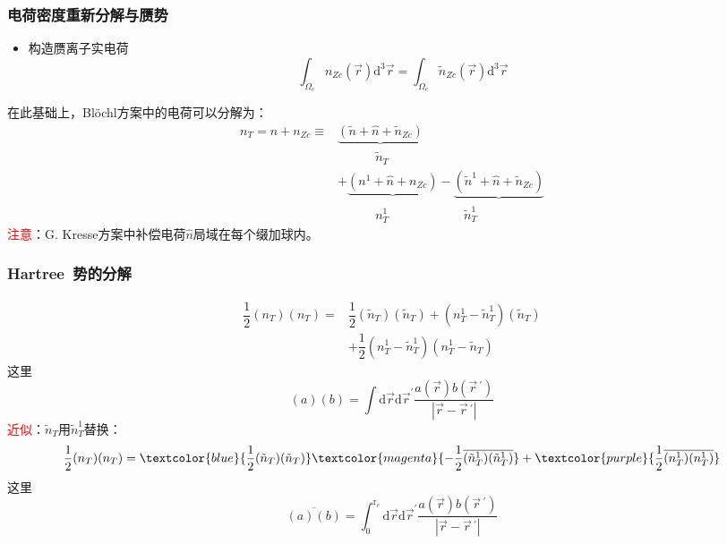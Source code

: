 \frame
{
	\frametitle{电荷密度重新分解与赝势}
\begin{itemize}
	\item 构造赝离子实电荷$$\int_{\Omega_c}n_{Zc}(\vec r)\mathrm{d}^3\vec r=\int_{\Omega_c}\tilde n_{Zc}(\vec r)\mathrm{d}^3\vec r$$
\end{itemize}
在此基础上，\textrm{Bl\"ochl}方案中的电荷可以分解为：
\begin{displaymath}
	\begin{aligned}
		n_T=n+n_{Zc}\equiv&\underbrace{(\tilde n+\hat n+\tilde n_{Zc})}\\
				 		&\quad\qquad\tilde n_T\\
				  &+\underbrace{(n^1+\hat n+n_{Zc})}-\underbrace{(\tilde n^1+\hat n+\tilde n_{Zc})}\\
				                  &\quad\qquad n_T^1\qquad\qquad\qquad\tilde n_T^1
	\end{aligned}
\end{displaymath}
\textcolor{red}{注意}：\textrm{G. Kresse}方案中补偿电荷$\hat n$局域在每个缀加球内。
}

\frame
{
	\frametitle{\textrm{Hartree~}势的分解}
\begin{displaymath}
	\begin{aligned}
		\dfrac12(n_T)(n_T)=&\dfrac12(\tilde n_T)(\tilde n_T)+(n_T^1-\tilde n_T^1)(\tilde n_T)\\
				&+\dfrac12(n_T^1-\tilde n_T^1)(n_T^1-\tilde n_T)
	\end{aligned}
\end{displaymath}
这里$$(a)(b)=\int\mathrm{d}\vec r\mathrm{d}\vec r^{\prime}\dfrac{a(\vec r)b(\vec r\,^{\prime})}{|\vec r-\vec r\,^{\prime}|}$$
\textcolor{red}{近似}：$\tilde n_T$用$\tilde n_T^1$替换：
\begin{displaymath}
	\dfrac12(n_T)(n_T)=\textcolor{blue}{\dfrac12(\tilde n_T)(\tilde n_T)}\textcolor{magenta}{-\dfrac12\overline{(\tilde n_T^1)(\tilde n_T^1)}}+\textcolor{purple}{\dfrac12\overline{(n_T^1)(n_T^1)}}
\end{displaymath}
这里$$\overline{(a)(b)}=\int_0^{\mathrm{r}_c}\mathrm{d}\vec r\mathrm{d}\vec r^{\prime}\dfrac{a(\vec r)b(\vec r\,^{\prime})}{|\vec r-\vec r\,^{\prime}|}$$
}

